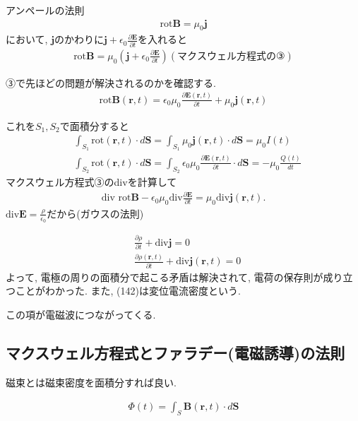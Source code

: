 \documentclass[a4paper,12pt]{jlreq}
\begin{document}
アンペールの法則
\begin{align}
  \text{rot}\bm{B} = \mu_0 \bm{j}
\end{align}
において, $\bm{j}$のかわりに$\bm{j} + \epsilon_0 \frac{\partial \bm{E}}{\partial t}$を入れると
\begin{align}
  \text{rot}\bm{B} = \mu_0 \left(\bm{j} + \epsilon_0 \frac{\partial \bm{E}}{\partial t}\right)　(マクスウェル方程式の③)
\end{align}

③で先ほどの問題が解決されるのかを確認する. 
\begin{align}
  \text{rot} \bm{B}(\bm{r},t)  =  \epsilon_0 \mu_0 \frac{\partial \bm{E}(\bm{r},t)}{\partial t} + \mu_0 \bm{j}(\bm{r},t)
\end{align}

これを$S_1, S_2$で面積分すると
\begin{align}
  &\int_{S_1}^{} \text{rot} (\bm{r},t) \cdot d\bm{S} = \int_{S_1}^{} \mu_0 \bm{j}(\bm{r},t) \cdot d\bm{S} = \mu_0 I(t)\\
  &\int_{S_2}^{} \text{rot} (\bm{r},t) \cdot d\bm{S} = \int_{S_2}^{} \epsilon_0 \mu_0\frac{\partial \bm{E}(\bm{r},t)}{\partial t} \cdot d\bm{S} = -\mu_0 \frac{Q(t)}{dt}
\end{align}
マクスウェル方程式③のdivを計算して
\begin{align}
  \text{div rot}\bm{B} - \epsilon_0 \mu_0 \text{div} \frac{\partial \bm{E}}{\partial t} = \mu_0 \text{div} \bm{j} (\bm{r},t).
\end{align}
$\text{div}\bm{E} = \frac{\rho}{\epsilon_0}$だから(ガウスの法則)

\begin{align}
  &\frac{\partial \rho}{\partial t} + \text{div}\bm{j} = 0\\
  &\frac{\partial \rho(\bm{r},t)}{\partial t} + \text{div}\bm{j}(\bm{r},t) = 0
\end{align}
よって, 電極の周りの面積分で起こる矛盾は解決されて, 
電荷の保存則が成り立つことがわかった. 
また, (142)は変位電流密度という.


この項が電磁波につながってくる. 




\newpage

\subsection*{マクスウェル方程式とファラデー(電磁誘導)の法則}
磁束とは磁束密度を面積分すれば良い. 

\begin{align}
  \Phi(t) = \int_{S}^{} \bm{B}(\bm{r},t) \cdot d\bm{S}
\end{align}
\end{document}
